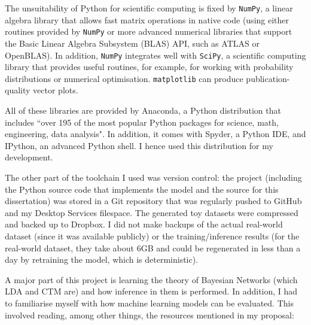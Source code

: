 \documentclass[12pt,a4paper,twoside,openright]{report}
\begin{document}
The unsuitability of Python for scientific computing is fixed by \texttt{NumPy}\cite{DBLP:journals/corr/abs-1102-1523}, a linear algebra library that allows fast matrix operations in native code (using either routines provided by \texttt{NumPy} or more advanced numerical libraries that support the Basic Linear Algebra Subsystem (BLAS) API, such as ATLAS or OpenBLAS). In addition, \texttt{NumPy} integrates well with \texttt{SciPy}, a scientific computing library that provides useful routines, for example, for working with probability distributions or numerical optimisation. \texttt{matplotlib} can produce publication-quality vector plots.

All of these libraries are provided by Anaconda, a Python distribution that includes ``over 195 of the most popular Python packages for science, math, engineering, data analysis". In addition, it comes with Spyder, a Python IDE, and IPython, an advanced Python shell. I hence used this distribution for my development.

The other part of the toolchain I used was version control: the project (including the Python source code that implements the model and the source for this dissertation) was stored in a Git repository that was regularly pushed to GitHub and my Desktop Services filespace. The generated toy datasets were compressed and backed up to Dropbox. I did not make backups of the actual real-world dataset (since it was available publicly) or the training/inference results (for the real-world dataset, they take about 6GB and could be regenerated in less than a day by retraining the model, which is deterministic).

A major part of this project is learning the theory of Bayesian Networks (which LDA and CTM are) and how inference in them is performed. In addition, I had to familiarise myself with how machine learning models can be evaluated. This involved reading, among other things, the resources mentioned in my proposal: 
\end{document}
